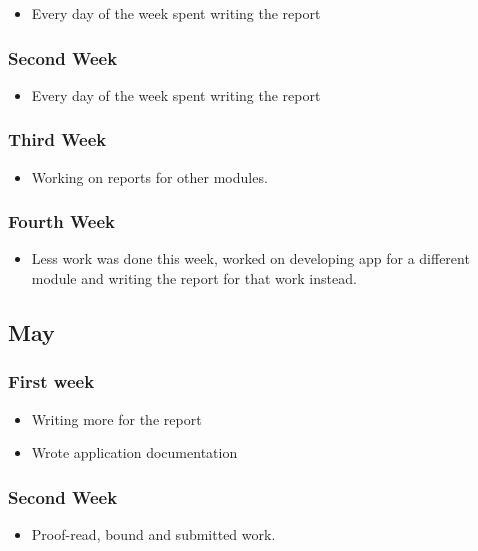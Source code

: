 \begin{itemize}
\tightlist
\item
  Every day of the week spent writing the report
\end{itemize}

\subsubsection*{Second Week}\label{second-week-6}

\begin{itemize}
\tightlist
\item
  Every day of the week spent writing the report
\end{itemize}

\subsubsection*{Third Week}\label{third-week-5}

\begin{itemize}
\tightlist
\item
  Working on reports for other modules.
\end{itemize}

\subsubsection*{Fourth Week}\label{fourth-week-5}

\begin{itemize}
\tightlist
\item
  Less work was done this week, worked on developing app for a different
  module and writing the report for that work instead.
\end{itemize}

\subsection{May}\label{may}

\subsubsection*{First week}\label{first-week-7}

\begin{itemize}
\tightlist
\item
  Writing more for the report
\item
  Wrote application documentation
\end{itemize}

\subsubsection*{Second Week}\label{second-week-7}

\begin{itemize}
\item
  Proof-read, bound and submitted work.

\end{itemize}
